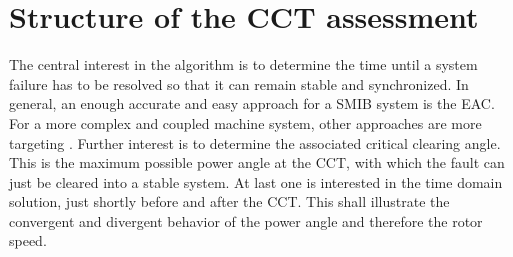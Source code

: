 \section{Structure of the \acs{CCT} assessment}

The central interest in the algorithm is to determine the time until a system failure has to be resolved so that it can remain stable and synchronized. In general, an enough accurate and easy approach for a \acf{SMIB} system is the \acf{EAC}. For a more complex and coupled machine system, other approaches are more targeting \autocite{batchuComparativeStudyEqual2022}. Further interest is to determine the associated critical clearing angle. This is the maximum possible power angle at the \acs{CCT}, with which the fault can just be cleared into a stable system. At last one is interested in the time domain solution, just shortly before and after the \acs{CCT}. This shall illustrate the convergent and divergent behavior of the power angle and therefore the rotor speed.

